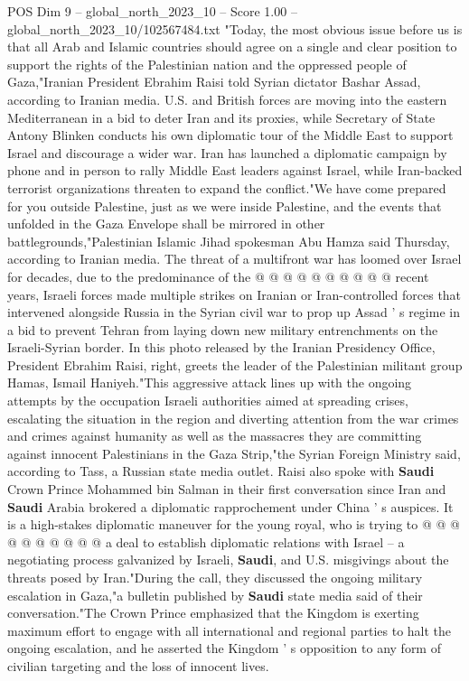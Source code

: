 \begin{textsample}{POS Dim 9 – global\_north\_2023\_10 – Score 1.00 – global\_north\_2023\_10/102567484.txt}  \label{ex:f9_pos_414}
"Today, the most obvious issue before us is that all Arab and Islamic countries should agree on a single and clear position to support the rights of the Palestinian nation and the oppressed people of Gaza,"Iranian President Ebrahim Raisi told Syrian dictator Bashar Assad, according to Iranian media.
U.S. and British forces are moving into the eastern Mediterranean in a bid to deter Iran and its proxies, while Secretary of State Antony Blinken conducts his own diplomatic tour of the Middle East to support Israel and discourage a wider war.
Iran has launched a diplomatic campaign by phone and in person to rally Middle East leaders against Israel, while Iran-backed terrorist organizations threaten to expand the conflict."We have come prepared for you outside Palestine, just as we were inside Palestine, and the events that unfolded in the Gaza Envelope shall be mirrored in other battlegrounds,"Palestinian Islamic Jihad spokesman Abu Hamza said Thursday, according to Iranian media.
The threat of a multifront war has loomed over Israel for decades, due to the predominance of the @ @ @ @ @ @ @ @ @ @ recent years, Israeli forces made multiple strikes on Iranian or Iran-controlled forces that intervened alongside Russia in the Syrian civil war to prop up Assad ' s regime in a bid to prevent Tehran from laying down new military entrenchments on the Israeli-Syrian border.
In this photo released by the Iranian Presidency Office, President Ebrahim Raisi, right, greets the leader of the Palestinian militant group Hamas, Ismail Haniyeh."This aggressive attack lines up with the ongoing attempts by the occupation Israeli authorities aimed at spreading crises, escalating the situation in the region and diverting attention from the war crimes and crimes against humanity as well as the massacres they are committing against innocent Palestinians in the Gaza Strip,"the Syrian Foreign Ministry said, according to Tass, a Russian state media outlet.
Raisi also spoke with \textbf{Saudi} Crown Prince Mohammed bin Salman in their first conversation since Iran and \textbf{Saudi} Arabia brokered a diplomatic rapprochement under China ' s auspices.
It is a high-stakes diplomatic maneuver for the young royal, who is trying to @ @ @ @ @ @ @ @ @ @ a deal to establish diplomatic relations with Israel -- a negotiating process galvanized by Israeli, \textbf{Saudi}, and U.S. misgivings about the threats posed by Iran."During the call, they discussed the ongoing military escalation in Gaza,"a bulletin published by \textbf{Saudi} state media said of their conversation."The Crown Prince emphasized that the Kingdom is exerting maximum effort to engage with all international and regional parties to halt the ongoing escalation, and he asserted the Kingdom ' s opposition to any form of civilian targeting and the loss of innocent lives.

\end{textsample}
